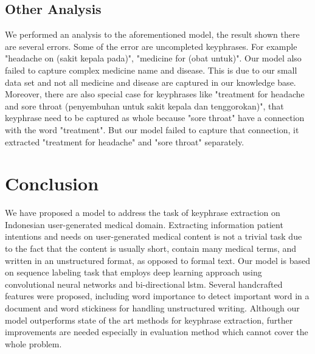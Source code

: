 \subsection{Other Analysis}
We performed an analysis to the aforementioned model, the result shown there are several errors. Some of the error are uncompleted keyphrases. For example "headache on (sakit kepala pada)", "medicine for (obat untuk)". Our model also failed to capture complex medicine name and disease. This is due to our small data set and not all medicine and disease are captured in our knowledge base. Moreover, there are also special case for keyphrases like "treatment for headache and sore throat (penyembuhan untuk sakit kepala dan tenggorokan)", that keyphrase need to be captured as whole because "sore throat" have a connection with the word "treatment". But our model failed to capture that connection, it extracted "treatment for headache" and "sore throat" separately.

\section{Conclusion}
We have proposed a model to address the task of keyphrase extraction on Indonesian user-generated medical domain. Extracting information patient intentions and needs on user-generated medical content is not a trivial task due to the fact that the content is usually short, contain many medical terms, and written in an unstructured format, as opposed to formal text. Our model is based on sequence labeling task that employs deep learning approach using convolutional neural networks and bi-directional lstm. Several handcrafted features were proposed, including word importance to detect important word in a document and word stickiness for handling unstructured writing. Although our model outperforms state of the art methods for keyphrase extraction, further improvements are needed especially in evaluation method which cannot cover the whole problem.
\iffalse
We investigate a keyphrase extraction problem especially in Indonesian medical questions domain with sequence labeling approach. We leverage a deep learning approach using CNNsand B-LSTM. Moreover, we also extracted nine features that capture medical concepts from a knowledge base, and linguistic components as our features. With this model and features, we are able to overcome problems such as informal language, short document, and medical domain specific. Our model achieves F1 score of 82.41\% on manually annotated Indonesian medical questions.

For handling several problems that occurred in this experiment, we suggest to create a language model for post-processing. The language model expected to handle cases like uncompleted keyphrase or connection between keyphrase.

Furthermore, we realized that there are no solid evaluation method for keyphrase extraction. Partial evaluation may handle how the model extract sequences in a document. However, weights for importance in sequences are different between words. For example "therapy for pregnancy", in that keyphrase we may realize that "pregnancy" is more important than other words. Thus partial evaluation failed to capture that problem.
\fi